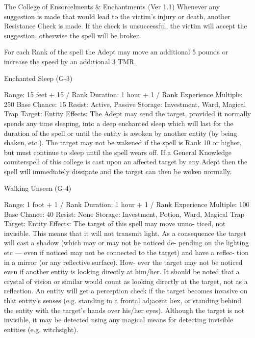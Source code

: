 \begin{Chapter}{The College of Ensorcelments \& Enchantments (Ver 1.1)}
Whenever any suggestion is made that would lead 
to  the  victim’s  injury  or  death,  another  Resistance 
Check  is  made.  If  the  check  is  unsuccessful,  the 
victim  will  accept  the  suggestion,  otherwise  the 
spell will be broken. 

For each Rank of the spell the Adept may move an 
additional  5  pounds  or  increase  the  speed  by  an 
additional 3 TMR. 

Enchanted Sleep (G-3) 

Range: 15 feet + 15 / Rank 
Duration: 1 hour + 1 / Rank 
Experience Multiple: 250 
Base Chance: 15%
Resist: Active, Passive 
Storage: Investment, Ward, Magical Trap 
Target: Entity 
Effects: The Adept may send the target, provided it 
normally  spends  any  time  sleeping,  into  a  deep 
enchanted sleep which will last for the duration of 
the  spell  or  until  the  entity  is  awoken  by  another 
entity  (by  being  shaken,  etc.).  The  target  may  not 
be  wakened  if  the  spell  is  Rank  10  or  higher,  but 
must continue to sleep until the spell wears off. If a 
General  Knowledge  counterspell  of  this  college  is 
cast upon an affected target by any Adept then the 
spell  will  immediately  dissipate  and the  target  can 
then be woken normally. 

Walking Unseen (G-4) 

Range: 1 foot + 1 / Rank 
Duration: 1 hour + 1 / Rank 
Experience Multiple: 100 
Base Chance: 40%
Resist: None 
Storage: Investment, Potion, Ward, Magical Trap 
Target: Entity 
Effects:  The  target  of  this  spell  may  move  unno-
ticed,  not  invisible.  This  means  that  it  will  not 
transmit light. As a consequence the target will cast 
a  shadow  (which  may  or  may  not  be  noticed  de-
pending on the lighting etc — even if noticed may 
not  be  connected  to  the  target)  and  have  a  reflec-
tion  in  a  mirror  (or  any  reflective  surface).  How-
ever  the  target  may  not be noticed  even  if  another 
entity  is  looking  directly  at  him/her.  It  should  be 
noted  that  a  crystal  of  vision  or  similar  would 
count  as  looking  directly  at  the  target,  not  as  a 
reflection.  An  entity  will  get  a  perception check if 
the target becomes invasive on that entity’s senses 
(e.g. standing in a frontal adjacent hex, or standing 
behind  the  entity  with  the  target’s  hands  over 
his/her eyes). Although the target is not invisible, it 
may  be  detected  using  any  magical  means  for 
detecting invisible entities (e.g. witchsight). 


\end{Chapter}
